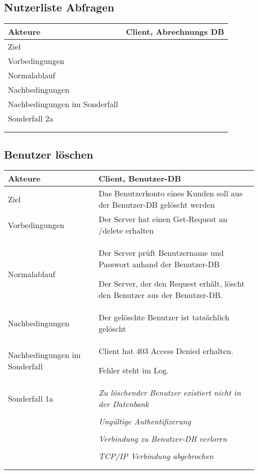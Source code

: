 \documentclass[a4paper,10pt,titlepage]{article}
\makeatletter
\newcommand\novspace{\@minipagetrue}
\newenvironment{owncompactitem}{%
\compactitem
}{%
\@finalstrut\@arstrutbox
\@nameuse{endcompactitem}%
\aftergroup\let\aftergroup\@finalstrut\aftergroup\@gobble
}
\newenvironment{owncompactenum}{%
\compactenum
}{%
\@finalstrut\@arstrutbox
\@nameuse{endcompactenum}%
\aftergroup\let\aftergroup\@finalstrut\aftergroup\@gobble
}
\newcommand{\usecase}[7]
{\subsection{#1}
\setlength{\extrarowheight}{2pt}
\begin{tabular}{|p{0.2\textwidth}|p{0.9\textwidth}|}
\hline
  Akteure & #2\\\hline
  Ziel & #3\\\hline
  Vorbedingungen & \novspace
  	\begin{owncompactitem}[-] #4 \end{owncompactitem} \\\hline
  Normalablauf & \vspace{-7pt}
  	\begin{owncompactenum}[1.] #6 \end{owncompactenum} \\\hline
  Nachbedingungen & \novspace
  	\begin{owncompactitem}[-] #5 \end{owncompactitem} \\\hline
  #7
\end{tabular}
}
\newcommand{\sonderfall}[4][\empty]
{
Sonderfall #2 & \vspace{-10pt}
	\textit{#3}
	\begin{owncompactenum}[{#2}.1] {#4} \end{owncompactenum}
  	\ifthenelse{\equal{#1}{\empty}}
    	{\\\hline} %
    	{\ensuremath{\rightarrow} #1 \\ [+1pt] \hline} %

}
\newcommand{\sondernachbedingung}[1]
{
Nachbedingungen im Sonderfall& \novspace
	\begin{owncompactitem}[-]
		#1
	\end{owncompactitem} \\\hline
}
\makeatother
\begin{document}
\usecase{Nutzerliste Abfragen}{Client, Abrechnungs DB}%
{}%
{%
  \item
}
{%
  \item
}
{%
  \item
}
{%
  \sondernachbedingung{
	\item
	}
  \sonderfall[Panic]{2a}%
	  {}%
	  {
	  \item .
	  }
}



\usecase{Benutzer löschen}{Client, Benutzer-DB}%
{Das Benutzerkonto eines Kunden soll aus der Benutzer-DB gelöscht werden}%
{%
  \item Der Server hat einen Get-Request an /delete erhalten
}
{%
  \item Der gelöschte Benutzer ist tatsächlich gelöscht
}
{%
  \item Der Server prüft Benutzername und Passwort anhand der Benutzer-DB
  \item Der Server, der den Request erhält, löscht den Benutzer aus der Benutzer-DB.
}
{%
  \sondernachbedingung{
	\item Client hat 403 Access Denied erhalten.
	\item Fehler steht im Log.
	}
  \sonderfall[Weiter mit normalem Betrieb]{1a}%
	  {Zu löschender Benutzer existiert nicht in der Datenbank}%
	  {
	  \item Der Server schickt eine entsprechende Fehlermeldung an den Client, der die Lösch-Anfrage verursacht hat
	  }
	  		\sonderfall[Weiter mit normalem Betrieb]{1a}
    {Ungültige Authentifizerung}
    {
    \item Fehler wird ins Log geschrieben
  	\item Der Client erhält eine entsprechende Fehlermeldung mit HTTP-Status 403 Access Denied
    }
	\sonderfall[Kritischer Fehler, Server ist beendet]{*}%
	{Verbindung zu Benutzer-DB verloren}%
  	{
	\item Der Fehler wird ins Log geschrieben (als schwerwiegender Fehler)
	\item Der Client erhält eine entsprechende Fehlermeldung
	\item Der Server wird beendet
  	}

\sonderfall[Weiter mit normalem Betrieb]{**}%
	{TCP/IP Verbindung abgebrochen}%
	{
	\item Fehlermeldung wird ins Log geschrieben
	}
}
\clearpage
\appendix
\end{document}
